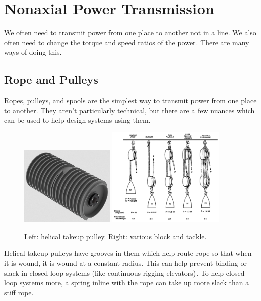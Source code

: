 \documentclass[10pt,letterpaper]{book}
\begin{document}
\section{Nonaxial Power Transmission}

We often need to transmit power from one place to another not in a line. We also often need to change the torque and speed ratios of the power. There are many ways of doing this.

\subsection{Rope and Pulleys}

Ropes, pulleys, and spools are the simplest way to transmit power from one place to another. They aren't particularly technical, but there are a few nuances which can be used to help design systems using them.

\begin{figure}[H]	
	\includegraphics[width=0.4\textwidth]{imgs/takeup_pulley.png}
	\includegraphics[width=0.5\textwidth]{imgs/block_tackle.png}
	\caption{Left: helical takeup pulley. Right: various block and tackle.}
\end{figure}

Helical takeup pulleys have grooves in them which help route rope so that when it is wound, it is wound at a constant radius. This can help prevent binding or slack in closed-loop systems (like continuous rigging elevators). To help closed loop systems more, a spring inline with the rope can take up more slack than a stiff rope.
\end{document}
